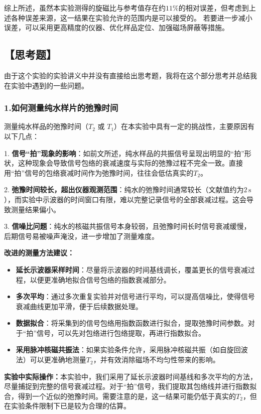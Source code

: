 \documentclass[12pt,a4paper,UTF8]{ctexart}
\begin{document}
综上所述，虽然本实验测得的旋磁比与参考值存在约$11\%$的相对误差，但考虑到上述各种误差来源，这一结果在实验允许的范围内是可以接受的。
若要进一步减小误差，可以采用更高精度的仪器、优化样品定位、加强磁场屏蔽等措施。


\subsection*{【思考题】}
由于这个实验的实验讲义中并没有直接给出思考题，我将在这个部分思考并总结我在实验中遇到的一些问题。

\subsubsection*{1.如何测量纯水样片的弛豫时间}
测量纯水样品的弛豫时间（$T_2$ 或 $T_1$）在本实验中具有一定的挑战性，主要原因有以下几点：

1. \textbf{信号“拍”现象的影响}：如前文所述，纯水样品的共振信号呈现出明显的“拍”形状，这种现象会导致信号包络的衰减速度与实际的弛豫过程不完全一致。直接用“拍”信号的包络衰减时间作为弛豫时间，往往会低估真实的$T_2$。

2. \textbf{弛豫时间较长，超出仪器观测范围}：纯水的弛豫时间通常较长（文献值约为$2\,\mathrm{s}$），而实验中示波器的时间窗口有限，难以完整记录信号的全部衰减过程。这会导致测量结果偏小。

3. \textbf{信噪比问题}：纯水的核磁共振信号本身较弱，且弛豫时间长时信号衰减缓慢，后期信号易被噪声淹没，进一步增加了测量难度。

\textbf{改进的测量方法建议：}
\begin{itemize}
    \item \textbf{延长示波器采样时间}：尽量将示波器的时间基线调长，覆盖更长的信号衰减过程，以便更准确地拟合信号包络的指数衰减部分。
    \item \textbf{多次平均}：通过多次重复实验并对信号进行平均，可以提高信噪比，使得信号衰减曲线更加平滑，便于后续数据处理。
    \item \textbf{数据拟合}：将采集到的信号包络用指数函数进行拟合，提取弛豫时间参数。对于“拍”信号，可以先对包络进行包络提取，再进行指数拟合。
    \item \textbf{采用脉冲核磁共振法}：如果实验条件允许，采用脉冲核磁共振（如自旋回波法）可以更准确地测量$T_2$，并有效消除磁场不均匀性带来的影响。
\end{itemize}

\textbf{实验中实际操作：}本实验中，我们采用了延长示波器时间基线和多次平均的方法，尽量捕捉到完整的信号衰减过程。对于“拍”信号，我们提取其包络线并进行指数拟合，得到一个近似的弛豫时间。需要注意的是，这一结果可能仍低于真实的$T_2$，但在实验条件限制下已是较为合理的估算。
\end{document}
